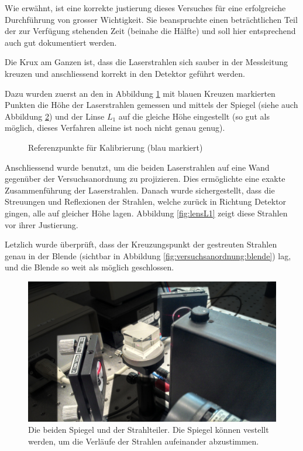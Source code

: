 Wie  erw\"ahnt,  ist eine  korrekte  justierung  dieses Versuches  f\"ur  eine
erfolgreiche  Durchf\"uhrung von  grosser Wichtigkeit. Sie  beanspruchte einen
betr\"achtlichen  Teil  der  zur   Verf\"ugung  stehenden  Zeit  (beinahe  die
H\"alfte) und soll hier entsprechend auch gut dokumentiert werden.

Die Krux am Ganzen ist, dass  die Laserstrahlen sich sauber in der Messleitung
kreuzen und anschliessend korrekt in den Detektor gef\"uhrt werden.

Dazu wurden zuerst an den in Abbildung \ref{fig:justierung} mit blauen Kreuzen
markierten  Punkten die  H\"ohe  der Laserstrahlen  gemessen  und mittels  der
Spiegel (siehe auch  Abbildung \ref{fig:spiegel}) und der Linse  $L_1$ auf die
gleiche H\"ohe eingestellt (so gut als m\"oglich, dieses Verfahren alleine ist
noch nicht genau genug).

\begin{figure}[h!t]
    \centering
    \resizebox{.67\textwidth}{!}{}
    \caption{%
        Referenzpunkte f\"ur Kalibrierung (blau markiert)
    }
    \label{fig:justierung}
\end{figure}

Anschliessend wurde
benutzt,   um   die   beiden   Laserstrahlen   auf   eine   Wand   gegen\"uber
der   Versuchsanordnung  zu   projizieren. Dies   erm\"oglichte  eine   exakte
Zusammenf\"uhrung  der Laserstrahlen. Danach  wurde  sichergestellt, dass  die
Streuungen und Reflexionen der Strahlen,  welche zur\"uck in Richtung Detektor
gingen, alle auf gleicher H\"ohe lagen. Abbildung \ref{fig:lensL1} zeigt diese
Strahlen vor ihrer Justierung.

Letzlich wurde \"uberpr\"uft, dass  der Kreuzungspunkt der gestreuten Strahlen
genau in der Blende (sichtbar in Abbildung \ref{fig:versuchsanordnung:blende})
lag, und die Blende so weit als m\"oglich geschlossen.

\begin{figure}[h!t]
    \centering
    \includegraphics[width=.67\textwidth]{images/spiegel.jpeg}
    \caption{%
        Die beiden Spiegel und der Strahlteiler. Die Spiegel k\"onnen vestellt
        werden, um die Verl\"aufe der Strahlen aufeinander abzustimmen.
    }
    \label{fig:spiegel}
\end{figure}


